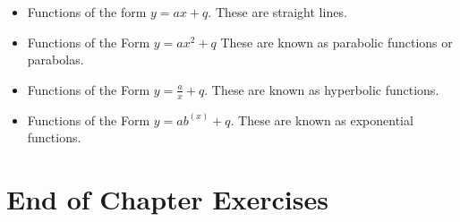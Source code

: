 \begin{itemize}[noitemsep]
\begin{itemize}[noitemsep]
            \item 
Functions of the form \begin{math}y=ax+q\end{math}. These are straight lines.\item 
Functions of the Form \begin{math}y=a{x}^{2}+q\end{math} These are known as parabolic functions or parabolas.\item 
Functions of the Form \begin{math}y=\frac{a}{x}+q\end{math}. These are known as hyperbolic functions.\item 
Functions of the Form \begin{math}y=a{b}^{\left(x\right)}+q\end{math}. These are known as exponential functions.\end{itemize}
        \end{itemize}
        \label{m39348*cid7}
            \section{ End of Chapter Exercises}
            \nopagebreak
            
